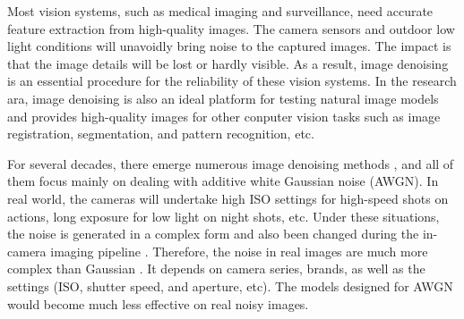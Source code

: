 \documentclass[10pt,twocolumn,letterpaper]{article}
\begin{document}
Most vision systems, such as medical imaging and surveillance, need accurate feature extraction from high-quality images. The camera sensors and outdoor low light conditions will unavoidly bring noise to the captured images. The impact is that the image details will be lost or hardly visible. As a result, image denoising is an essential procedure for the reliability of these vision systems. In the research ara, image denoising is also an ideal platform for testing natural image models and provides high-quality images for other conputer vision tasks such as image registration, segmentation, and pattern recognition, etc. 

For several decades, there emerge numerous image denoising methods \cite{nlm,foe,ksvd,bm3d,lssc,epll,mlp,wnnm,csf,pgpd,chen2015learning}, and all of them focus mainly on dealing with additive white Gaussian noise (AWGN). In real world, the cameras will undertake high ISO settings for high-speed shots on actions, long exposure for low light on night shots, etc. Under these situations, the noise is generated in a complex form and also been changed during the in-camera imaging pipeline \cite{NewInCamera,crosschannel2016}. Therefore, the noise in real images are much more complex than Gaussian \cite{crosschannel2016,healey1994radiometric}. It depends on camera series, brands, as well as the settings (ISO, shutter speed, and aperture, etc). The models designed for AWGN would become much less effective on real noisy images. 
\end{document}
